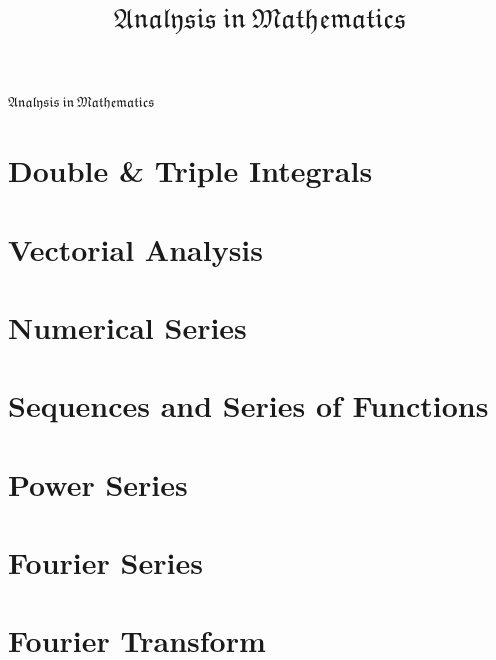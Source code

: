 \documentclass[11pt, a4paper]{article}
\title{$\mathfrak{Analysis\ in\ Mathematics}$}
\author{}
\date{}
\begin{document}
\vspace*{2cm}
\begin{center}
    \huge{$\mathfrak{Analysis\ in\ Mathematics}$}
    \vspace*{3cm}
    \tableofcontents
    \newpage
\end{center}

\section{Double \& Triple Integrals}

\newpage


\newpage
\section{Vectorial Analysis}
% 
\newpage


\newpage
\section{Numerical Series}
% 


\newpage
\section{Sequences and Series of Functions}
% 


\newpage
\section{Power Series}
% 


\newpage
\section{Fourier Series}
% 


\newpage
\section{Fourier Transform}
% 


% 
% 
\end{document}
